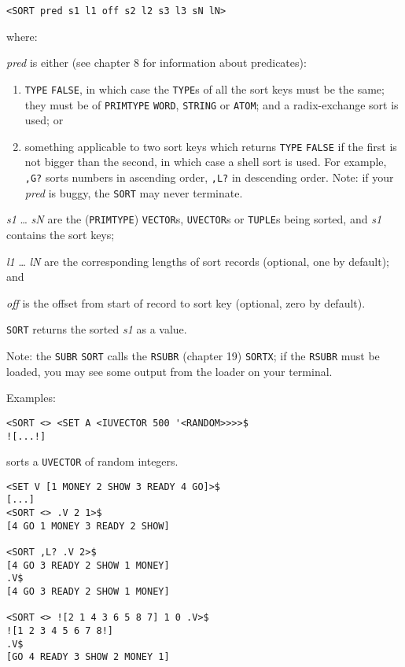 \documentclass[a4paper]{scrbook}
\providecommand{\tightlist}{%
  \setlength{\itemsep}{0pt}\setlength{\parskip}{0pt}}
\begin{document}
\begin{verbatim}
<SORT pred s1 l1 off s2 l2 s3 l3 sN lN>
\end{verbatim}

where:

\emph{pred} is either (see chapter 8 for information about predicates):

\begin{enumerate}
\def\labelenumi{\arabic{enumi}.}
\tightlist
\item
  \texttt{TYPE} \texttt{FALSE}, in which case the \texttt{TYPE}s of all the sort keys must be the same; they must be of
  \texttt{PRIMTYPE} \texttt{WORD}, \texttt{STRING} or \texttt{ATOM}; and a radix-exchange sort is used; or
\item
  something applicable to two sort keys which returns \texttt{TYPE} \texttt{FALSE} if the first is not bigger than the
  second, in which case a shell sort is used. For example, \texttt{,G?} sorts numbers in ascending order, \texttt{,L?} in
  descending order. Note: if your \emph{pred} is buggy, the \texttt{SORT} may never terminate.
\end{enumerate}

\emph{s1} \ldots{} \emph{sN} are the (\texttt{PRIMTYPE}) \texttt{VECTOR}s, \texttt{UVECTOR}s or \texttt{TUPLE}s being
sorted, and \emph{s1} contains the sort keys;

\emph{l1} \ldots{} \emph{lN} are the corresponding lengths of sort records (optional, one by default); and

\emph{off} is the offset from start of record to sort key (optional, zero by default).

\texttt{SORT} returns the sorted \emph{s1} as a value.

Note: the \texttt{SUBR} \texttt{SORT} calls the \texttt{RSUBR} (chapter 19) \texttt{SORTX}; if the
\texttt{RSUBR} must be loaded, you may see some output from the loader on your terminal.

Examples:

\begin{verbatim}
<SORT <> <SET A <IUVECTOR 500 '<RANDOM>>>>$
![...!]
\end{verbatim}

sorts a \texttt{UVECTOR} of random integers.

\begin{verbatim}
<SET V [1 MONEY 2 SHOW 3 READY 4 GO]>$
[...]
<SORT <> .V 2 1>$
[4 GO 1 MONEY 3 READY 2 SHOW]

<SORT ,L? .V 2>$
[4 GO 3 READY 2 SHOW 1 MONEY]
.V$
[4 GO 3 READY 2 SHOW 1 MONEY]

<SORT <> ![2 1 4 3 6 5 8 7] 1 0 .V>$
![1 2 3 4 5 6 7 8!]
.V$
[GO 4 READY 3 SHOW 2 MONEY 1]
\end{verbatim}
\end{document}
